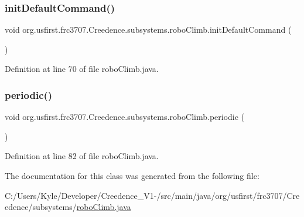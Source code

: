 \subsubsection{\texorpdfstring{initDefaultCommand()}{initDefaultCommand()}}
{\footnotesize\ttfamily void org.\+usfirst.\+frc3707.\+Creedence.\+subsystems.\+robo\+Climb.\+init\+Default\+Command (\begin{DoxyParamCaption}{ }\end{DoxyParamCaption})}



Definition at line 70 of file robo\+Climb.\+java.

\mbox{\label{classorg_1_1usfirst_1_1frc3707_1_1_creedence_1_1subsystems_1_1robo_climb_a03cd52a86be8f78cd25b8c3406f971bd}} 
\subsubsection{\texorpdfstring{periodic()}{periodic()}}
{\footnotesize\ttfamily void org.\+usfirst.\+frc3707.\+Creedence.\+subsystems.\+robo\+Climb.\+periodic (\begin{DoxyParamCaption}{ }\end{DoxyParamCaption})}



Definition at line 82 of file robo\+Climb.\+java.



The documentation for this class was generated from the following file\+:\begin{DoxyCompactItemize}
\item 
C\+:/\+Users/\+Kyle/\+Developer/\+Creedence\+\_\+\+V1-\//src/main/java/org/usfirst/frc3707/\+Creedence/subsystems/\mbox{\hyperlink{robo_climb_8java}{robo\+Climb.\+java}}\end{DoxyCompactItemize}
